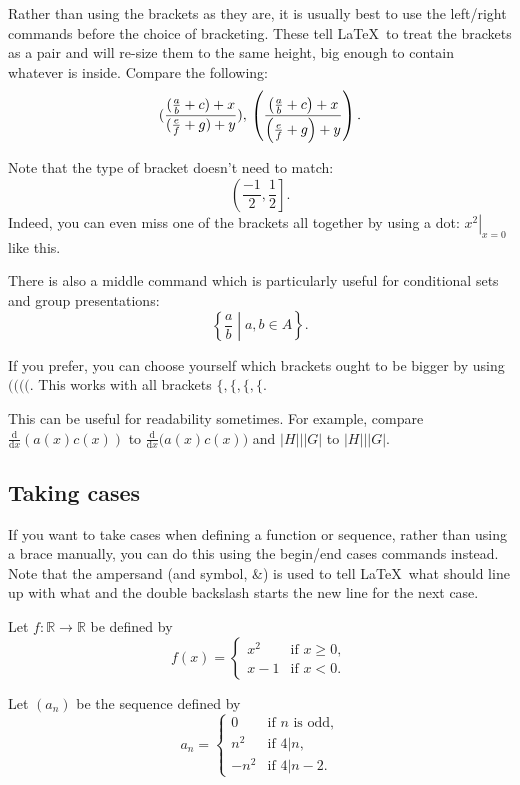 \documentclass[a4paper,11pt]{article}
\begin{document}
Rather than using the brackets as they are, it is usually best to use the left/right commands before the choice of bracketing. These tell \LaTeX \, to treat the brackets as a pair and will re-size them to the same height, big enough to contain whatever is inside. Compare the following:
\[ 
 (\frac{( \frac{a}{b}+ c )+ x}{(\frac{e}{f}+ g )+y}),\\
 \left(\frac{\left(\frac{a}{b}+ c \right)+ x}{\left(\frac{e}{f}+ g \right)+y}\right).
\]

Note that the type of bracket doesn't need to match: 
\[ 
\left(  \frac{-1}{2}, \frac{1}{2} \right].
\]
Indeed, you can even miss one of the brackets all together by using a dot: $\left. x^2 \right|_{x=0}$ like this.

There is also a middle command  which is particularly useful for conditional sets and group presentations:
\[ 
 \left\{\frac{a}{b} \middle|  a,b \in A\right\}.
\]

If you prefer, you can choose yourself which brackets ought to be bigger by using $ \big( \Big( \bigg( \Bigg($. This works with all brackets  $ \big\{, \Big\{, \bigg\{,\Bigg\{$.

This can be useful for readability sometimes. For example, compare $\frac{\mathrm{d}}{\mathrm{d}x}(a(x)c(x))$ to $\frac{\mathrm{d}}{\mathrm{d}x}\Big(a(x)c(x)\Big)$ and 
$|H| | |G|$ to $|H| \Big| |G|$.




\subsection{Taking cases}

If you want to take cases when defining a function or sequence,  rather than using a brace manually, you can do this using the begin/end cases commands instead. Note that the ampersand (and symbol, \&) is used to tell \LaTeX \, what should line up with what and the double backslash starts the new line for the next case.

Let $f\colon \mathbb{R} \to \mathbb{R}$ be defined by 
\[ 
f(x)= 
\begin{cases}
 x^2  & \text{if } x \geq0, \\ 
 x-1  & \text{if } x <0 .
\end{cases} 
\]
 
Let $(a_n)$ be the sequence defined by
\[ 
a_n= 
\begin{cases}
 0     & \text{if } n \text { is odd,}  \\ 
 n^2   & \text{if } 4 | n, \\
 -n^2  & \text{if } 4 | n-2. 
\end{cases} 
\]
\end{document}

